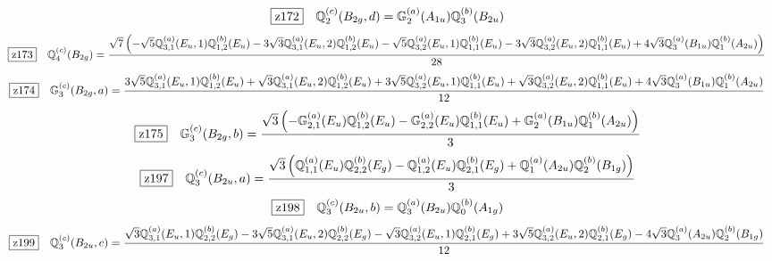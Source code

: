 \documentclass[fleqn,10pt,landscape]{jsarticle}
\begin{document}
\begin{dmath*}
\hspace*{3mm}\fbox{z172}\quad \mathbb{Q}_{2}^{(c)}(B_{2g},d)=\mathbb{G}_{2}^{(a)}(A_{1u}) \mathbb{Q}_{3}^{(b)}(B_{2u})
\end{dmath*}
\begin{dmath*}
\hspace*{3mm}\fbox{z173}\quad \mathbb{Q}_{4}^{(c)}(B_{2g})=\frac{\sqrt{7} \left(- \sqrt{5} \mathbb{Q}_{3,1}^{(a)}(E_{u},1) \mathbb{Q}_{1,2}^{(b)}(E_{u}) - 3 \sqrt{3} \mathbb{Q}_{3,1}^{(a)}(E_{u},2) \mathbb{Q}_{1,2}^{(b)}(E_{u}) - \sqrt{5} \mathbb{Q}_{3,2}^{(a)}(E_{u},1) \mathbb{Q}_{1,1}^{(b)}(E_{u}) - 3 \sqrt{3} \mathbb{Q}_{3,2}^{(a)}(E_{u},2) \mathbb{Q}_{1,1}^{(b)}(E_{u}) + 4 \sqrt{3} \mathbb{Q}_{3}^{(a)}(B_{1u}) \mathbb{Q}_{1}^{(b)}(A_{2u})\right)}{28}
\end{dmath*}
\begin{dmath*}
\hspace*{3mm}\fbox{z174}\quad \mathbb{G}_{3}^{(c)}(B_{2g},a)=\frac{3 \sqrt{5} \mathbb{Q}_{3,1}^{(a)}(E_{u},1) \mathbb{Q}_{1,2}^{(b)}(E_{u}) + \sqrt{3} \mathbb{Q}_{3,1}^{(a)}(E_{u},2) \mathbb{Q}_{1,2}^{(b)}(E_{u}) + 3 \sqrt{5} \mathbb{Q}_{3,2}^{(a)}(E_{u},1) \mathbb{Q}_{1,1}^{(b)}(E_{u}) + \sqrt{3} \mathbb{Q}_{3,2}^{(a)}(E_{u},2) \mathbb{Q}_{1,1}^{(b)}(E_{u}) + 4 \sqrt{3} \mathbb{Q}_{3}^{(a)}(B_{1u}) \mathbb{Q}_{1}^{(b)}(A_{2u})}{12}
\end{dmath*}
\begin{dmath*}
\hspace*{3mm}\fbox{z175}\quad \mathbb{G}_{3}^{(c)}(B_{2g},b)=\frac{\sqrt{3} \left(- \mathbb{G}_{2,1}^{(a)}(E_{u}) \mathbb{Q}_{1,2}^{(b)}(E_{u}) - \mathbb{G}_{2,2}^{(a)}(E_{u}) \mathbb{Q}_{1,1}^{(b)}(E_{u}) + \mathbb{G}_{2}^{(a)}(B_{1u}) \mathbb{Q}_{1}^{(b)}(A_{2u})\right)}{3}
\end{dmath*}
\begin{dmath*}
\hspace*{3mm}\fbox{z197}\quad \mathbb{Q}_{3}^{(c)}(B_{2u},a)=\frac{\sqrt{3} \left(\mathbb{Q}_{1,1}^{(a)}(E_{u}) \mathbb{Q}_{2,2}^{(b)}(E_{g}) - \mathbb{Q}_{1,2}^{(a)}(E_{u}) \mathbb{Q}_{2,1}^{(b)}(E_{g}) + \mathbb{Q}_{1}^{(a)}(A_{2u}) \mathbb{Q}_{2}^{(b)}(B_{1g})\right)}{3}
\end{dmath*}
\begin{dmath*}
\hspace*{3mm}\fbox{z198}\quad \mathbb{Q}_{3}^{(c)}(B_{2u},b)=\mathbb{Q}_{3}^{(a)}(B_{2u}) \mathbb{Q}_{0}^{(b)}(A_{1g})
\end{dmath*}
\begin{dmath*}
\hspace*{3mm}\fbox{z199}\quad \mathbb{Q}_{3}^{(c)}(B_{2u},c)=\frac{\sqrt{3} \mathbb{Q}_{3,1}^{(a)}(E_{u},1) \mathbb{Q}_{2,2}^{(b)}(E_{g}) - 3 \sqrt{5} \mathbb{Q}_{3,1}^{(a)}(E_{u},2) \mathbb{Q}_{2,2}^{(b)}(E_{g}) - \sqrt{3} \mathbb{Q}_{3,2}^{(a)}(E_{u},1) \mathbb{Q}_{2,1}^{(b)}(E_{g}) + 3 \sqrt{5} \mathbb{Q}_{3,2}^{(a)}(E_{u},2) \mathbb{Q}_{2,1}^{(b)}(E_{g}) - 4 \sqrt{3} \mathbb{Q}_{3}^{(a)}(A_{2u}) \mathbb{Q}_{2}^{(b)}(B_{1g})}{12}
\end{dmath*}
\end{document}
